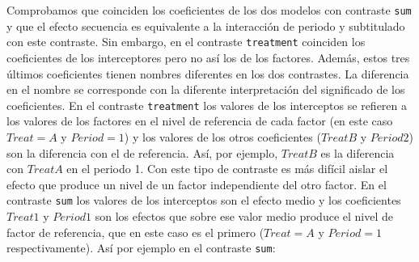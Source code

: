 \documentclass[
  12pt,
  a4paper,
  extrafontsizes,
  onecolumn,
  openright,
  table]{memoir}
\begin{document}
\normalsize

Comprobamos que coinciden los coeficientes de los dos modelos con
contraste \texttt{sum} y que el efecto secuencia es equivalente a la
interacción de periodo y subtitulado con este contraste. Sin embargo, en
el contraste \texttt{treatment} coinciden los coeficientes de los
interceptores pero no así los de los factores. Además, estos tres
últimos coeficientes tienen nombres diferentes en los dos contrastes. La
diferencia en el nombre se corresponde con la diferente interpretación
del significado de los coeficientes. En el contraste \texttt{treatment}
los valores de los interceptos se refieren a los valores de los factores
en el nivel de referencia de cada factor (en este caso \(Treat = A\) y
\(Period = 1\)) y los valores de los otros coeficientes (\(TreatB\) y
\(Period2\)) son la diferencia con el de referencia. Así, por ejemplo,
\(TreatB\) es la diferencia con \(TreatA\) en el periodo 1. Con este
tipo de contraste es más difícil aislar el efecto que produce un nivel
de un factor independiente del otro factor. En el contraste \texttt{sum}
los valores de los interceptos son el efecto medio y los coeficientes
\(Treat1\) y \(Period1\) son los efectos que sobre ese valor medio
produce el nivel de factor de referencia, que en este caso es el primero
(\(Treat = A\) y \(Period = 1\) respectivamente). Así por ejemplo en el
contraste \texttt{sum}:
\end{document}
